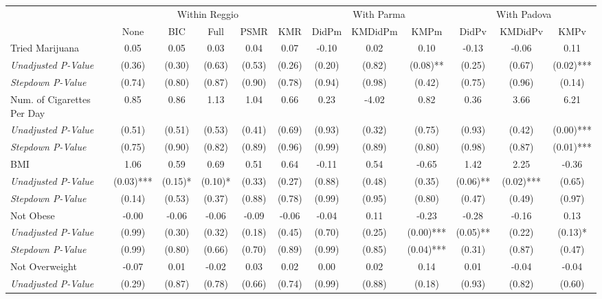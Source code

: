 \begin{tabular}{l c c c c c c c c c c c}
\toprule
& \multicolumn{5}{c}{Within Reggio} & \multicolumn{3}{c}{With Parma} & \multicolumn{3}{c}{With Padova} \\\cmidrule(lr){2-6} \cmidrule(lr){7-9} \cmidrule(lr){10-12}
 & None & BIC & Full & PSMR & KMR & DidPm & KMDidPm & KMPm & DidPv & KMDidPv & KMPv \\
\midrule
Tried Marijuana & 0.05 & 0.05 & 0.03 & 0.04 & 0.07 & -0.10 & 0.02 & 0.10 & -0.13 & -0.06 & 0.11 \\
\quad \textit{Unadjusted P-Value} & (0.36) & (0.30) & (0.63) & (0.53) & (0.26) & (0.20) & (0.82) & (0.08)** & (0.25) & (0.67) & (0.02)*** \\
\quad \textit{Stepdown P-Value} & (0.74) & (0.80) & (0.87) & (0.90) & (0.78) & (0.94) & (0.98) & (0.42) & (0.75) & (0.96) & (0.14) \\
Num. of Cigarettes Per Day & 0.85 & 0.86 & 1.13 & 1.04 & 0.66 & 0.23 & -4.02 & 0.82 & 0.36 & 3.66 & 6.21 \\
\quad \textit{Unadjusted P-Value} & (0.51) & (0.51) & (0.53) & (0.41) & (0.69) & (0.93) & (0.32) & (0.75) & (0.93) & (0.42) & (0.00)*** \\
\quad \textit{Stepdown P-Value} & (0.75) & (0.90) & (0.82) & (0.89) & (0.96) & (0.99) & (0.89) & (0.80) & (0.98) & (0.87) & (0.01)*** \\
BMI & 1.06 & 0.59 & 0.69 & 0.51 & 0.64 & -0.11 & 0.54 & -0.65 & 1.42 & 2.25 & -0.36 \\
\quad \textit{Unadjusted P-Value} & (0.03)*** & (0.15)* & (0.10)* & (0.33) & (0.27) & (0.88) & (0.48) & (0.35) & (0.06)** & (0.02)*** & (0.65) \\
\quad \textit{Stepdown P-Value} & (0.14) & (0.53) & (0.37) & (0.88) & (0.78) & (0.99) & (0.95) & (0.80) & (0.47) & (0.49) & (0.97) \\
Not Obese & -0.00 & -0.06 & -0.06 & -0.09 & -0.06 & -0.04 & 0.11 & -0.23 & -0.28 & -0.16 & 0.13 \\
\quad \textit{Unadjusted P-Value} & (0.99) & (0.30) & (0.32) & (0.18) & (0.45) & (0.70) & (0.25) & (0.00)*** & (0.05)** & (0.22) & (0.13)* \\
\quad \textit{Stepdown P-Value} & (0.99) & (0.80) & (0.66) & (0.70) & (0.89) & (0.99) & (0.85) & (0.04)*** & (0.31) & (0.87) & (0.47) \\
Not Overweight & -0.07 & 0.01 & -0.02 & 0.03 & 0.02 & 0.00 & 0.02 & 0.14 & 0.01 & -0.04 & -0.04 \\
\quad \textit{Unadjusted P-Value} & (0.29) & (0.87) & (0.78) & (0.66) & (0.74) & (0.99) & (0.88) & (0.18) & (0.93) & (0.82) & (0.60) \\

\end{tabular}

